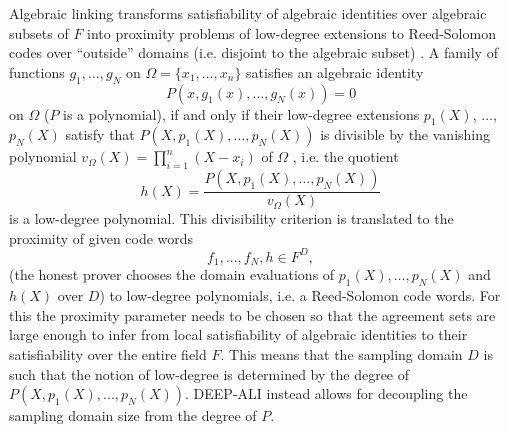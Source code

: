 \documentclass[11pt]{article}
\theoremstyle{definition}
\theoremstyle{remark}
\begin{document}
Algebraic linking transforms satisfiability of algebraic identities over algebraic subsets of $F$ into proximity problems of low-degree extensions to Reed-Solomon codes over ``outside'' domains (i.e. disjoint to the algebraic subset) . 
A family of functions $g_1,\ldots, g_N$ on $\Omega =\{x_1,...,x_n\}$  satisfies an algebraic identity 
\[
P(x, g_1(x),\ldots, g_N(x)) = 0  
\] 
on $\Omega$ ($P$ is a polynomial), if and only if their low-degree extensions $p_1(X)$, $\ldots$, $p_N(X)$ satisfy that $P(X, p_1(X), \ldots, p_N(X))$ is divisible by the vanishing polynomial $v_\Omega(X)=\prod_{i=1}^n (X-x_i)$ of $\Omega$ , i.e. the quotient 
\[
h(X)= \frac{P(X, p_1(X),..., p_N(X))}{v_\Omega(X)} 
\]
is a low-degree polynomial. 
This divisibility criterion is translated to the proximity of given code words 
\[
f_1,..., f_N, h\in F^D,
\]
(the honest prover chooses the domain evaluations of $p_1(X),\ldots, p_N(X)$ and $h(X)$ over $D$) to low-degree polynomials, i.e. a Reed-Solomon code words\footnotemark.
%
For this the proximity parameter needs to be chosen so that the agreement sets are large enough to infer from local satisfiability of algebraic identities to their satisfiability over the entire field $F$. 
This means that the sampling domain $D$ is such that the notion of low-degree is determined by the degree of $P(X,p_1(X),..., p_N(X))$. 
DEEP-ALI instead allows for decoupling the sampling domain size from the degree of $P$. 
\end{document}
